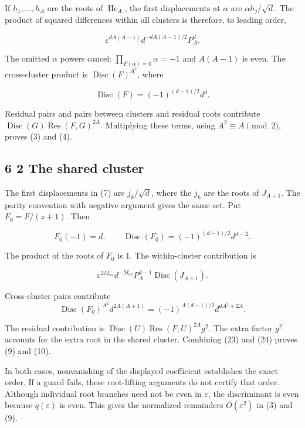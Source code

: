\documentclass[
  11pt,
]{article}
\begin{document}
If \(h_1,\ldots,h_A\) are the roots of \(\operatorname{He}_A\), the
first displacements at \(\alpha\) are \(\alpha h_j/\sqrt d\). The
product of squared differences within all clusters is therefore, to
leading order,

\[
\varepsilon^{dA(A-1)}d^{-dA(A-1)/2}P_A^d. \tag{21}
\]

The omitted \(\alpha\) powers cancel: \(\prod_{F(\alpha)=0}\alpha=-1\)
and \(A(A-1)\) is even. The cross-cluster product is
\(\operatorname{Disc}(F)^{A^2}\), where

\[
\operatorname{Disc}(F)=(-1)^{(d-1)/2}d^d. \tag{22}
\]

Residual pairs and pairs between clusters and residual roots contribute
\(\operatorname{Disc}(G)\operatorname{Res}(F,G)^{2A}\). Multiplying
these terms, using \(A^2\equiv A\pmod2\), proves (3) and (4).

\subsection{6 2 The shared cluster}\label{the-shared-cluster}

The first displacements in (7) are \(j_k/\sqrt d\), where the \(j_k\)
are the roots of \(J_{A+1}\). The parity convention with negative
argument gives the same set. Put \(F_0=F/(z+1)\). Then

\[
F_0(-1)=d,\qquad
\operatorname{Disc}(F_0)=(-1)^{(d-1)/2}d^{d-2}.
\]

The product of the roots of \(F_0\) is \(1\). The within-cluster
contribution is

\[
\varepsilon^{2M_{\mathrm{ov}}}d^{-M_{\mathrm{ov}}}
P_A^{d-1}\operatorname{Disc}(J_{A+1}). \tag{23}
\]

Cross-cluster pairs contribute
\nopagebreak[4]
\[
\operatorname{Disc}(F_0)^{A^2}d^{2A(A+1)}
=(-1)^{A(d-1)/2}d^{dA^2+2A}. \tag{24}
\]

The residual contribution is
\(\operatorname{Disc}(U)\operatorname{Res}(F,U)^{2A}g^2\). The extra
factor \(g^2\) accounts for the extra root in the shared cluster.
Combining (23) and (24) proves (9) and (10).

In both cases, nonvanishing of the displayed coefficient establishes the
exact order. If a guard fails, these root-lifting arguments do not
certify that order. Although individual root branches need not be even
in \(\varepsilon\), the discriminant is even because \(q(\varepsilon)\)
is even. This gives the normalized remainders \(O(\varepsilon^2)\) in
(3) and (9).
\end{document}
